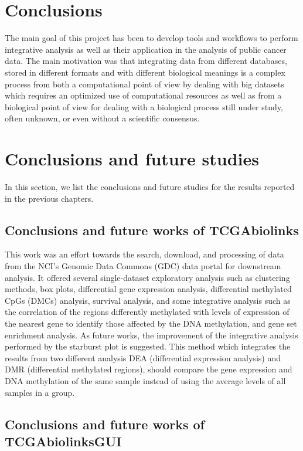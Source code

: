 \section{Conclusions}


The main goal of this project has been to develop tools and workflows to perform integrative analysis as well as their application in the analysis of public cancer data. The main motivation was that integrating data from different databases, stored in different formats and with different biological meanings is a complex process from both a computational point of view by dealing with big datasets which requires an optimized use of computational resources as well as from a biological point of view for dealing with a biological process still under study, often unknown, or even without a scientific consensus.

\section{Conclusions and future studies}

In this section, we list the conclusions and future studies for the results reported in the previous chapters.

\subsection{Conclusions and future works of TCGAbiolinks}

This work was an effort towards the search, download, and
processing of data from the NCI's Genomic Data Commons (GDC) data portal for
downstream analysis. It offered several single-dataset
exploratory analysis such as clustering methods, box plots,
 differential gene expression analysis, differential methylated CpGs (DMCs) analysis,
 survival analysis, and some integrative analysis
  such as the correlation of the regions differently methylated with levels of expression of the nearest gene to identify those affected by the DNA methylation, and gene set enrichment analysis.
As future works, the improvement of the integrative analysis performed by the starburst plot is suggested. This method which integrates the results from two different analysis DEA (differential expression analysis) and DMR (differential methylated regions), should compare the gene expression and DNA methylation of the same sample instead of using the average levels of all samples in a group.

\subsection{Conclusions and future works of TCGAbiolinksGUI}

